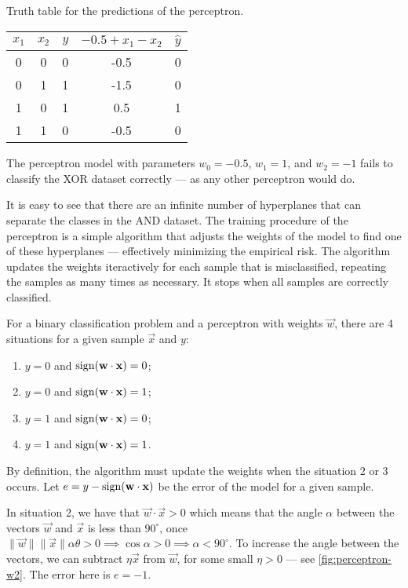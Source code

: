 \begin{tablebox}[label=tab:xor-perceptron]{Truth table for the predictions of the perceptron.}
  \centering
  \begin{tabular}{ccc|cc}
    \toprule
    $x_1$ & $x_2$ & $y$ & $-0.5 + x_1 - x_2$ & $\hat{y}$ \\
    \midrule
    0 & 0 & 0 & -0.5 & 0 \\
    0 & 1 & 1 & -1.5 & 0 \\
    1 & 0 & 1 & 0.5 & 1 \\
    1 & 1 & 0 & -0.5 & 0 \\
    \bottomrule
  \end{tabular}
  \tcblower
  The perceptron model with parameters $w_0 = -0.5$, $w_1 = 1$, and $w_2 = -1$
  fails to classify the XOR dataset correctly --- as any other perceptron would do.
\end{tablebox}

It is easy to see that there are an infinite number of hyperplanes that can separate the
classes in the AND dataset.  The training procedure of the perceptron is a simple
algorithm that adjusts the weights of the model to find one of these hyperplanes ---
effectively minimizing the empirical risk.  The algorithm updates the weights iteractively
for each sample that is misclassified, repeating the samples as many times as necessary.
It stops when all samples are correctly classified.

For a binary classification problem and a perceptron with weights $\vec{w}$, there are 4
situations for a given sample $\vec{x}$ and $y$:
\begin{enumerate}
  \itemsep0em
  \item $y = 0$ and $\operatorname{sign}(\mathbf{w} \cdot \mathbf{x})= 0$;
  \item $y = 0$ and $\operatorname{sign}(\mathbf{w} \cdot \mathbf{x})= 1$;
  \item $y = 1$ and $\operatorname{sign}(\mathbf{w} \cdot \mathbf{x})= 0$;
  \item $y = 1$ and $\operatorname{sign}(\mathbf{w} \cdot \mathbf{x})= 1$.
\end{enumerate}

By definition, the algorithm must update the weights when the situation 2 or 3 occurs.
Let $e = y - \operatorname{sign}(\mathbf{w} \cdot \mathbf{x})$ be the error of the model for a given sample.

In situation 2, we have that $\vec{w} \cdot \vec{x} > 0$ which means that the angle
$\alpha$ between the vectors $\vec{w}$ and $\vec{x}$ is less than $90^\circ$, once
$\|\vec{w}\|\|\vec{x}\|\alpha\theta > 0 \implies \cos\alpha > 0 \implies \alpha <
90^\circ$.  To increase the angle between the vectors, we can subtract $\eta\vec{x}$ from
$\vec{w}$, for some small $\eta > 0$ --- see \cref{fig:perceptron-w2}.  The error
here is $e = -1$.

